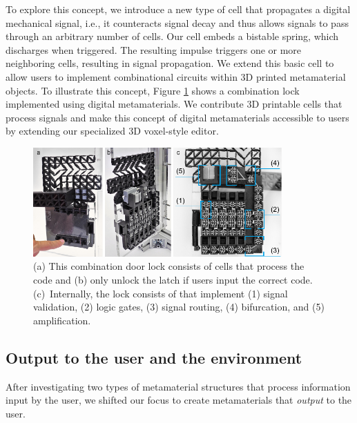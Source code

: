 To explore this concept, we introduce a new type of cell that propagates a digital mechanical signal, i.e., it counteracts signal decay and thus allows signals to pass through an arbitrary number of cells. Our cell embeds a bistable spring, which discharges when triggered. The resulting impulse triggers one or more neighboring cells, resulting in signal propagation. We extend this basic cell to allow users to implement combinational circuits within 3D printed metamaterial objects. To illustrate this concept, Figure \ref{fig:3-overview-digital-metamaterials} shows a combination lock implemented using digital metamaterials. We contribute 3D printable cells that process signals and make this concept of digital metamaterials accessible to users by extending our specialized 3D voxel-style editor.

\begin{figure} [h] %
    \centering
    \includegraphics[width=0.85\textwidth]{chapters/introduction-FIG/3-overview-digital-metamaterials.pdf}
    \caption[Short figure name.]{(a) This combination door lock consists of cells that process the code and (b) only unlock the latch if users input the correct code. (c)~Internally, the lock consists of that implement (1) signal validation, (2) logic gates, (3) signal routing, (4) bifurcation, and (5) amplification.
    \label{fig:3-overview-digital-metamaterials}}
\end{figure}


\subsection{Output to the user and the environment}

After investigating two types of metamaterial structures that process information input by the user, we shifted our focus to create metamaterials that \textit{output} to the user. 


